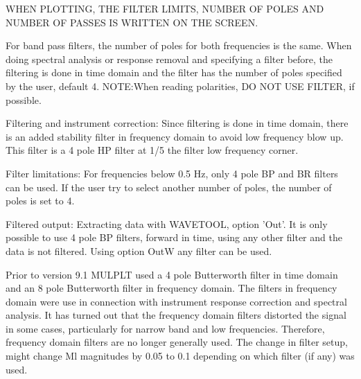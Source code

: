WHEN PLOTTING, THE FILTER LIMITS, NUMBER OF POLES AND NUMBER OF PASSES IS WRITTEN ON THE SCREEN.

For band pass filters, the number of poles for both frequencies is the same. When doing spectral analysis or response removal and specifying a filter before, the filtering is done in time domain and the filter has the number of poles specified by the user, default 4. NOTE:When reading polarities, DO NOT USE FILTER, if possible.

Filtering and instrument correction: Since filtering is done in time domain, there is an added stability filter in frequency domain to avoid low frequency blow up. This filter is a 4 pole HP filter at 1/5 the filter low frequency corner. 

Filter limitations: For frequencies below 0.5 Hz, only 4 pole BP and BR filters can be used. If the user try to select another number of poles, the number of poles is set to 4.  

Filtered output: Extracting data with WAVETOOL, option 'Out'. It is only possible to use 4 pole BP filters, forward in time, using any other filter and the data is not filtered. Using option OutW  any filter can be used.


Prior to version 9.1
MULPLT used a 4 pole Butterworth filter in time domain and an 8 pole Butterworth filter in frequency domain. The filters in frequency domain were use in connection with instrument response correction and spectral analysis. It has turned out that the frequency domain filters distorted the signal in some cases, particularly for narrow band and low frequencies. Therefore, frequency domain filters are no longer generally used.  The change in filter setup, might change Ml magnitudes by 0.05 to 0.1 depending on which filter (if any) was used.

